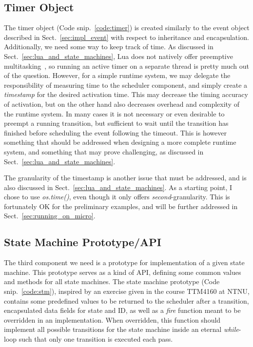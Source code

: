 \subsection{Timer Object}
\label{sec:impl_timer}
The timer object (Code snip.~\ref{code:timer}) is created similarly to the event object described in Sect.~\ref{sec:impl_event} with respect to inheritance and encapsulation. Additionally, we need some way to keep track of time. As discussed in Sect.~\ref{sec:lua_and_state_machines}, Lua does not natively offer preemptive multitasking~\cite[2.6]{manual:lua_reference_manual}, so running an active timer on a separate thread is pretty much out of the question. However, for a simple runtime system, we may delegate the responsibility of measuring time to the scheduler component, and simply create a \emph{timestamp} for the desired activation time. This may decrease the timing accuracy of activation, but on the other hand also decreases overhead and complexity of the runtime system. In many cases it is not necessary or even desirable to preempt a running transition, but sufficient to wait until the transition has finished before scheduling the event following the timeout. This is however something that should be addressed when designing a more complete runtime system, and something that may prove challenging, as discussed in Sect.~\ref{sec:lua_and_state_machines}.

The granularity of the timestamp is another issue that must be addressed, and is also discussed in Sect.~\ref{sec:lua_and_state_machines}. As a starting point, I chose to use \emph{os.time()}, even though it only offers \emph{second}-granularity. This is fortunately OK for the preliminary examples, and will be further addressed in Sect.~\ref{sec:running_on_micro}.

\subsection{State Machine Prototype/API}
\label{sec:impl_stm}
The third component we need is a prototype for implementation of a given state machine. This prototype serves as a kind of API, defining some common values and methods for all state machines. The state machine prototype (Code snip.~\ref{code:stm}), inspired by an exercise given in the course TTM4160 at NTNU, contains some predefined values to be returned to the scheduler after a transition, encapsulated data fields for state and ID, as well as a \emph{fire} function meant to be overridden in an implementation. When overridden, this function should implement all possible transitions for the state machine inside an eternal \emph{while}-loop such that only one transition is executed each pass.

